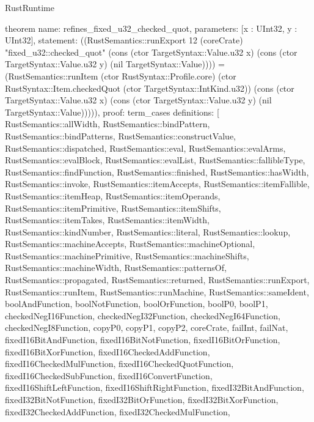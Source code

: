 \begin{lexlean}{RustRuntime}
\begin{semanticmodule}
theorem{
  name: refines_fixed_u32_checked_quot,
  parameters: [x : UInt32, y : UInt32],
  statement: ((RustSemantics::runExport 12 (coreCrate) "fixed_u32::checked_quot" (cons (ctor TargetSyntax::Value.u32 x) (cons (ctor TargetSyntax::Value.u32 y) (nil TargetSyntax::Value)))) = (RustSemantics::runItem (ctor RustSyntax::Profile.core) (ctor RustSyntax::Item.checkedQuot (ctor TargetSyntax::IntKind.u32)) (cons (ctor TargetSyntax::Value.u32 x) (cons (ctor TargetSyntax::Value.u32 y) (nil TargetSyntax::Value))))),
  proof: term_cases{
    definitions: [
      RustSemantics::allWidth,
      RustSemantics::bindPattern,
      RustSemantics::bindPatterns,
      RustSemantics::constructValue,
      RustSemantics::dispatched,
      RustSemantics::eval,
      RustSemantics::evalArms,
      RustSemantics::evalBlock,
      RustSemantics::evalList,
      RustSemantics::fallibleType,
      RustSemantics::findFunction,
      RustSemantics::finished,
      RustSemantics::hasWidth,
      RustSemantics::invoke,
      RustSemantics::itemAccepts,
      RustSemantics::itemFallible,
      RustSemantics::itemHeap,
      RustSemantics::itemOperands,
      RustSemantics::itemPrimitive,
      RustSemantics::itemShifts,
      RustSemantics::itemTakes,
      RustSemantics::itemWidth,
      RustSemantics::kindNumber,
      RustSemantics::literal,
      RustSemantics::lookup,
      RustSemantics::machineAccepts,
      RustSemantics::machineOptional,
      RustSemantics::machinePrimitive,
      RustSemantics::machineShifts,
      RustSemantics::machineWidth,
      RustSemantics::patternsOf,
      RustSemantics::propagated,
      RustSemantics::returned,
      RustSemantics::runExport,
      RustSemantics::runItem,
      RustSemantics::runMachine,
      RustSemantics::sameIdent,
      boolAndFunction,
      boolNotFunction,
      boolOrFunction,
      boolP0,
      boolP1,
      checkedNegI16Function,
      checkedNegI32Function,
      checkedNegI64Function,
      checkedNegI8Function,
      copyP0,
      copyP1,
      copyP2,
      coreCrate,
      failInt,
      failNat,
      fixedI16BitAndFunction,
      fixedI16BitNotFunction,
      fixedI16BitOrFunction,
      fixedI16BitXorFunction,
      fixedI16CheckedAddFunction,
      fixedI16CheckedMulFunction,
      fixedI16CheckedQuotFunction,
      fixedI16CheckedSubFunction,
      fixedI16ConvertFunction,
      fixedI16ShiftLeftFunction,
      fixedI16ShiftRightFunction,
      fixedI32BitAndFunction,
      fixedI32BitNotFunction,
      fixedI32BitOrFunction,
      fixedI32BitXorFunction,
      fixedI32CheckedAddFunction,
      fixedI32CheckedMulFunction,
}}
\end{semanticmodule}
\end{lexlean}
